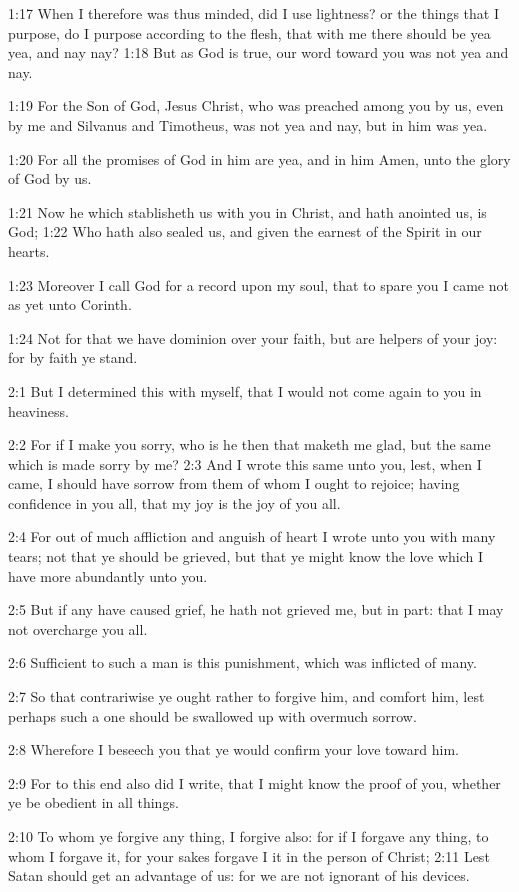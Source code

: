 1:17 When I therefore was thus minded, did I use lightness? or the things that I purpose, do I purpose according to the flesh, that with me there should be yea yea, and nay nay?  1:18 But as God is true, our word toward you was not yea and nay.

1:19 For the Son of God, Jesus Christ, who was preached among you by us, even by me and Silvanus and Timotheus, was not yea and nay, but in him was yea.

1:20 For all the promises of God in him are yea, and in him Amen, unto the glory of God by us.

1:21 Now he which stablisheth us with you in Christ, and hath anointed us, is God; 1:22 Who hath also sealed us, and given the earnest of the Spirit in our hearts.

1:23 Moreover I call God for a record upon my soul, that to spare you I came not as yet unto Corinth.

1:24 Not for that we have dominion over your faith, but are helpers of your joy: for by faith ye stand.

2:1 But I determined this with myself, that I would not come again to you in heaviness.

2:2 For if I make you sorry, who is he then that maketh me glad, but the same which is made sorry by me?  2:3 And I wrote this same unto you, lest, when I came, I should have sorrow from them of whom I ought to rejoice; having confidence in you all, that my joy is the joy of you all.

2:4 For out of much affliction and anguish of heart I wrote unto you with many tears; not that ye should be grieved, but that ye might know the love which I have more abundantly unto you.

2:5 But if any have caused grief, he hath not grieved me, but in part: that I may not overcharge you all.

2:6 Sufficient to such a man is this punishment, which was inflicted of many.

2:7 So that contrariwise ye ought rather to forgive him, and comfort him, lest perhaps such a one should be swallowed up with overmuch sorrow.

2:8 Wherefore I beseech you that ye would confirm your love toward him.

2:9 For to this end also did I write, that I might know the proof of you, whether ye be obedient in all things.

2:10 To whom ye forgive any thing, I forgive also: for if I forgave any thing, to whom I forgave it, for your sakes forgave I it in the person of Christ; 2:11 Lest Satan should get an advantage of us: for we are not ignorant of his devices.

